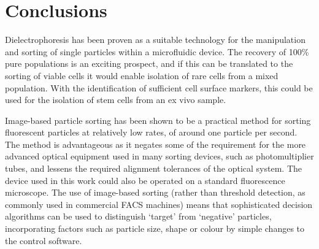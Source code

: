 

\section{Conclusions}
Dielectrophoresis has been proven as a suitable technology for the manipulation and sorting of single particles within a microfluidic device. The recovery of 100\% pure populations is an exciting prospect, and if this can be translated to the sorting of viable cells it would enable isolation of rare cells from a mixed population. With the identification of sufficient cell surface markers, this could be used for the isolation of stem cells from an ex vivo sample.

Image-based particle sorting has been shown to be a practical method for sorting fluorescent particles at relatively low rates, of around one particle per second. The method is advantageous as it negates some of the requirement for the more advanced optical equipment used in many sorting devices, such as photomultiplier tubes, and lessens the required alignment tolerances of the optical system. The device used in this work could also be operated on a standard fluorescence microscope. The use of image-based sorting (rather than threshold detection, as commonly used in commercial FACS machines) means that sophisticated decision algorithms can be used to distinguish `target' from `negative' particles, incorporating factors such as particle size, shape or colour by simple changes to the control software. 

